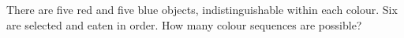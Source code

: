 There are five red and five blue objects, indistinguishable within each colour. Six are selected and eaten in order. How many colour sequences are possible?
